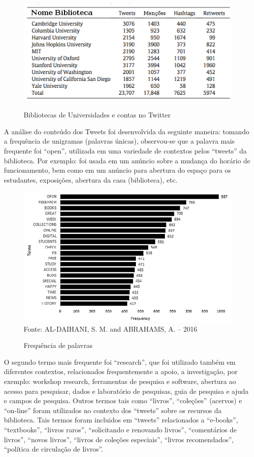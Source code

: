 \begin{figure}
\centering
\caption{Bibliotecas de Universidades e contas no Twitter}
\includegraphics[width=0.7\linewidth]{Figuras/Twitter/contaPalavras}
\label{fig:contaPalavras}
\end{figure}

\pagebreak

A análise do conteúdo dos Tweets foi desenvolvida da seguinte maneira: tomando a frequência de unigramas (palavras únicas), observou-se que a palavra mais frequente foi “open”, utilizada em uma variedade de contextos pelos ``tweets'' da biblioteca. Por exemplo: foi usada em um anúncio sobre a mudança do horário de funcionamento, bem como em um anúncio para abertura do espaço para os estudantes, exposições, abertura da casa (biblioteca), etc. 

\begin{figure}[ht]
	\centering
	\caption{Frequência de palavras}
	\includegraphics[width=0.6\linewidth]{Figuras/Twitter/ferqPalavras}\\
	\tiny Fonte: AL-DAIHANI, S. M. and ABRAHAMS, A. -- 2016
	\label{fig:ferqPalavras}
\end{figure}


O segundo termo mais frequente foi ``research'', que foi utilizado também em diferentes contextos, relacionados frequentemente a apoio, a investigação, por exemplo: workshop research, ferramentas de pesquisa e software, abertura ao acesso para pesquisar, dados e laboratório de pesquisas, guia de pesquisa e ajuda e campos de pesquisa. Outros termos tais como “livros”, “coleções” (acervos) e “on-line” foram utilizados no contexto dos ``tweets'' sobre os recursos da biblioteca. Tais termos foram incluidos em ``tweets'' relacionados a “e-books”, “textbooks”, “livros raros”, “solicitando e renovando livros”, “comentários de livros”, “novos livros”, “livros de coleções especiais”, “livros recomendados”, “política de circulação de livros”. 

